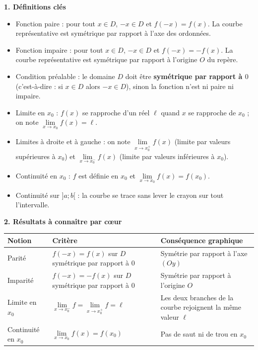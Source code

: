 \documentclass[11pt]{article}
\newcommand{\cle}[1]{{\popxbold\color{popdark}#1}}
\begin{document}
\begin{aretenir}
\textbf{1. Définitions clés}
\begin{itemize}
  \item \cle{Fonction paire} : pour tout $x\in D$, $-x\in D$ et $f(-x)=f(x)$. La courbe représentative est symétrique par rapport à l'axe des ordonnées.
  \item \cle{Fonction impaire} : pour tout $x\in D$, $-x\in D$ et $f(-x)=-f(x)$. La courbe représentative est symétrique par rapport à l'origine $O$ du repère.
  \item \cle{Condition préalable} : le domaine $D$ doit être \textbf{symétrique par rapport à $0$} (c'est-à-dire : si $x\in D$ alors $-x\in D$), sinon la fonction n'est ni paire ni impaire.
  \item \cle{Limite en $x_0$} : $f(x)$ se rapproche d'un réel $\ell$ quand $x$ se rapproche de $x_0$ ; on note $\lim\limits_{x\to x_0} f(x)=\ell$.
  \item \cle{Limites à droite et à gauche} : on note $\lim\limits_{x\to x_0^+} f(x)$ (limite par valeurs supérieures à $x_0$) et $\lim\limits_{x\to x_0^-} f(x)$ (limite par valeurs inférieures à $x_0$).
  \item \cle{Continuité en $x_0$} : $f$ est définie en $x_0$ et $\lim\limits_{x\to x_0} f(x)=f(x_0)$.
  \item \cle{Continuité sur $]a;b[$} : la courbe se trace \og sans lever le crayon \fg{} sur tout l'intervalle.
\end{itemize}

\textbf{2. Résultats à connaître par cœur}
\begin{center}
\begin{tabularx}{\linewidth}{|l|X|X|}
\hline
\rowcolor{popblueL} \textbf{Notion} & \textbf{Critère} & \textbf{Conséquence graphique} \\
\hline
Parité & $f(-x)=f(x)$ sur $D$ symétrique par rapport à $0$ & Symétrie par rapport à l'axe $(Oy)$ \\
\hline
Imparité & $f(-x)=-f(x)$ sur $D$ symétrique par rapport à $0$ & Symétrie par rapport à l'origine $O$ \\
\hline
Limite en $x_0$ & $\lim\limits_{x\to x_0^-}f=\lim\limits_{x\to x_0^+}f=\ell$ & Les deux branches de la courbe rejoignent la même valeur $\ell$ \\
\hline
Continuité en $x_0$ & $\lim\limits_{x\to x_0}f(x)=f(x_0)$ & Pas de saut ni de trou en $x_0$ \\
\hline
\end{tabularx}
\end{center}


\end{aretenir}
\end{document}
